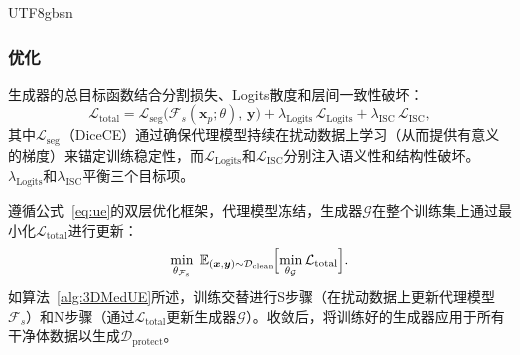 \documentclass[a4paper,11pt]{article}
\begin{document}
\begin{CJK}{UTF8}{gbsn}
\subsubsection{优化}
生成器的总目标函数结合分割损失、Logits散度和层间一致性破坏：
\begin{equation}
  \mathcal{L}_{\mathrm{total}}
  =\mathcal{L}_{\mathrm{seg}}\!\big(\mathcal{F}_s(\bm{x}_p;\theta),\,\bm{y}\big)
  +\lambda_{\text{Logits}}\,\mathcal{L}_{\text{Logits}}
  +\lambda_{\text{ISC}}\,\mathcal{L}_{\text{ISC}},
  \label{eq:total}
\end{equation}
其中$\mathcal{L}_{\mathrm{seg}}$（DiceCE）通过确保代理模型持续在扰动数据上学习（从而提供有意义的梯度）来锚定训练稳定性，而$\mathcal{L}_{\text{Logits}}$和$\mathcal{L}_{\text{ISC}}$分别注入语义性和结构性破坏。$\lambda_{\text{Logits}}$和$\lambda_{\text{ISC}}$平衡三个目标项。

遵循公式~\eqref{eq:ue}的双层优化框架，代理模型冻结，生成器$\mathcal{G}$在整个训练集上通过最小化$\mathcal{L}_{\mathrm{total}}$进行更新：
\begin{equation}
  \min_{\theta_{\mathcal{F}_s}}\;
  \mathbb{E}_{(\bm{x},\bm{y})\sim\mathcal{D}_{\mathrm{clean}}}
  \!\Bigl[\min_{\theta_{\mathcal{G}}}
    \mathcal{L}_{\mathrm{total}}\Bigr].
  \label{eq:bilevel}
\end{equation}
如算法~\ref{alg:3DMedUE}所述，训练交替进行S步骤（在扰动数据上更新代理模型$\mathcal{F}_s$）和N步骤（通过$\mathcal{L}_{\mathrm{total}}$更新生成器$\mathcal{G}$）。收敛后，将训练好的生成器应用于所有干净体数据以生成$\mathcal{D}_{\mathrm{protect}}$。


\end{CJK}
\end{document}
